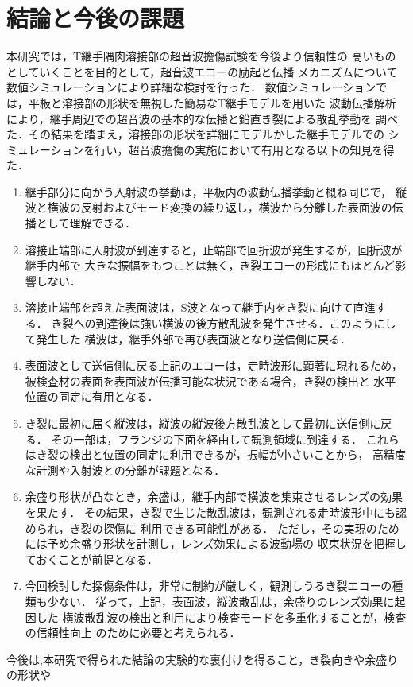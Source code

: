﻿\documentclass[11pt,a4j]{mybook2}
\begin{document}
\chapter{結論と今後の課題}
本研究では，T継手隅肉溶接部の超音波擔傷試験を今後より信頼性の
高いものとしていくことを目的として，超音波エコーの励起と伝播
メカニズムについて数値シミュレーションにより詳細な検討を行った．
数値シミュレーションでは，平板と溶接部の形状を無視した簡易なT継手モデルを用いた
波動伝播解析により，継手周辺での超音波の基本的な伝播と鉛直き裂による散乱挙動を
調べた．その結果を踏まえ，溶接部の形状を詳細にモデルかした継手モデルでの
シミュレーションを行い，超音波擔傷の実施において有用となる以下の知見を得た．
\begin{enumerate}
\item
	継手部分に向かう入射波の挙動は，平板内の波動伝播挙動と概ね同じで，
	縦波と横波の反射およびモード変換の繰り返し，横波から分離した表面波の伝播として理解できる．
\item
	溶接止端部に入射波が到達すると，止端部で回折波が発生するが，回折波が継手内部で
	大きな振幅をもつことは無く，き裂エコーの形成にもほとんど影響しない．
\item
	溶接止端部を超えた表面波は，S波となって継手内をき裂に向けて直進する．
	き裂への到達後は強い横波の後方散乱波を発生させる．このようにして発生した
	横波は，継手外部で再び表面波となり送信側に戻る．
\item
	表面波として送信側に戻る上記のエコーは，走時波形に顕著に現れるため，
	被検査材の表面を表面波が伝播可能な状況である場合，き裂の検出と
	水平位置の同定に有用となる．
\item
	き裂に最初に届く縦波は，縦波の縦波後方散乱波として最初に送信側に戻る．
	その一部は，フランジの下面を経由して観測領域に到達する．
	これらはき裂の検出と位置の同定に利用できるが，振幅が小さいことから，
	高精度な計測や入射波との分離が課題となる．
\item
	余盛り形状が凸なとき，余盛は，継手内部で横波を集束させるレンズの効果を果たす．
	その結果，き裂で生じた散乱波は，観測される走時波形中にも認められ，き裂の探傷に
	利用できる可能性がある．
	ただし，その実現のためには予め余盛り形状を計測し，レンズ効果による波動場の
	収束状況を把握しておくことが前提となる．
\item
	今回検討した探傷条件は，非常に制約が厳しく，観測しうるき裂エコーの種類も少ない．
	従って，上記，表面波，縦波散乱は，余盛りのレンズ効果に起因した
	横波散乱波の検出と利用により検査モードを多重化することが，検査の信頼性向上
	のために必要と考えられる．
\end{enumerate}
今後は,本研究で得られた結論の実験的な裏付けを得ること，き裂向きや余盛りの形状や
\end{document}
